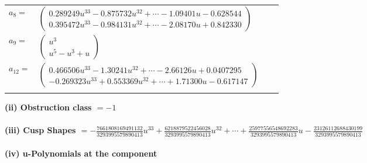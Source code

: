 \documentclass[1p]{elsarticle_modified}
\theoremstyle{definition}
\begin{document}
\begin{tabular}{m{7pt} m{180pt} m{7pt} m{180pt} }
\flushright $a_{8}=$&$\begin{pmatrix}0.289249 u^{33}-0.875732 u^{32}+\cdots-1.09401 u-0.628544\\0.395472 u^{33}-0.984131 u^{32}+\cdots-2.08170 u+0.842330\end{pmatrix}$ \\
\flushright $a_{9}=$&$\begin{pmatrix}u^3\\u^5- u^3+u\end{pmatrix}$ \\
\flushright $a_{12}=$&$\begin{pmatrix}0.466506 u^{33}-1.30241 u^{32}+\cdots-2.66126 u+0.0407295\\-0.269323 u^{33}+0.553369 u^{32}+\cdots+1.71300 u-0.617147\end{pmatrix}$\\&\end{tabular}
\flushleft \textbf{(ii) Obstruction class $= -1$}\\~\\
\flushleft \textbf{(iii) Cusp Shapes $= -\frac{7661808169491132}{3293995579890413} u^{33}+\frac{6218879522456028}{3293995579890413} u^{32}+\cdots+\frac{25977556548692283}{3293995579890413} u-\frac{23126112688430199}{3293995579890413}$}\\~\\
\newpage\renewcommand{\arraystretch}{1}
\flushleft \textbf{(iv) u-Polynomials at the component}\newline \\
\end{document}
